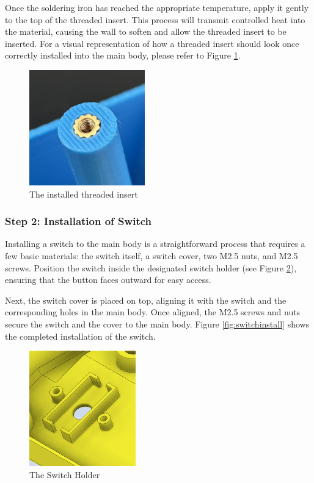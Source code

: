 Once the soldering iron has reached the appropriate temperature, apply it gently to the top of the threaded insert. This process will transmit controlled heat into the material, causing the wall to soften and allow the threaded insert to be inserted. For a visual representation of how a threaded insert should look once correctly installed into the main body, please refer to Figure \ref{fig:threadedinsert}.

\begin{figure}[!ht]
    \centering
    \includegraphics[height=5cm]{texs/Part1/chapter5/image/threadinstall.jpg}
    \caption{The installed threaded insert}
    \label{fig:threadedinsert}
\end{figure}

\subsubsection{Step 2: Installation of Switch}
Installing a switch to the main body is a straightforward process that requires a few basic materials: the switch itself, a switch cover, two M2.5 nuts, and M2.5 screws. Position the switch inside the designated switch holder (see Figure \ref{fig:switchholder}), ensuring that the button faces outward for easy access.

Next, the switch cover is placed on top, aligning it with the switch and the corresponding holes in the main body. Once aligned, the M2.5 screws and nuts secure the switch and the cover to the main body. Figure \ref{fig:switchinstall} shows the completed installation of the switch.

\begin{figure}[!ht]
    \centering
    \includegraphics[height=5cm]{texs/Part1/chapter5/image/switchhole.png}
    \caption{The Switch Holder}
    \label{fig:switchholder}
\end{figure}

